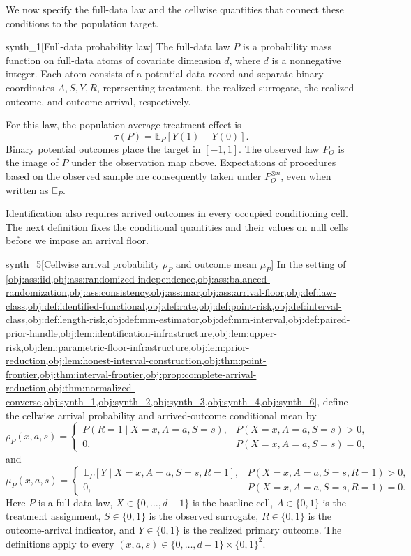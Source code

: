 We now specify the full-data law and the cellwise quantities that connect these conditions to the population target.

\begin{definitionv}{synth_1}[Full-data probability law]
The full-data law \(P\) is a probability mass function on full-data atoms of covariate dimension \(d\), where \(d\) is a nonnegative integer. Each atom consists of a potential-data record and separate binary coordinates \(A,S,Y,R\), representing treatment, the realized surrogate, the realized outcome, and outcome arrival, respectively.
\end{definitionv}

For this law, the population average treatment effect  is
\[
\tau(P)=\mathbb E_P\!\left[Y(1)-Y(0)\right].
\]
Binary potential outcomes place the target in \([-1,1]\). The observed law \(P_O\) is the image of \(P\) under the observation map above. Expectations of procedures based on the observed sample are consequently taken under \(P_O^{\otimes n}\), even when written as \(\mathbb E_P\).

Identification also requires arrived outcomes in every occupied conditioning cell. The next definition fixes the conditional quantities and their values on null cells before we impose an arrival floor.

\begin{definitionv}{synth_5}[Cellwise arrival probability $\rho_P$ and outcome mean $\mu_P$]
In the setting of \cref{obj:ass:iid,obj:ass:randomized-independence,obj:ass:balanced-randomization,obj:ass:consistency,obj:ass:mar,obj:ass:arrival-floor,obj:def:law-class,obj:def:identified-functional,obj:def:rate,obj:def:point-risk,obj:def:interval-class,obj:def:length-risk,obj:def:mm-estimator,obj:def:mm-interval,obj:def:paired-prior-handle,obj:lem:identification-infrastructure,obj:lem:upper-risk,obj:lem:parametric-floor-infrastructure,obj:lem:prior-reduction,obj:lem:honest-interval-construction,obj:thm:point-frontier,obj:thm:interval-frontier,obj:prop:complete-arrival-reduction,obj:thm:normalized-converse,obj:synth_1,obj:synth_2,obj:synth_3,obj:synth_4,obj:synth_6}, define the cellwise arrival probability and arrived-outcome conditional mean by
\[
\rho_P(x,a,s)=
\begin{cases}
P(R=1\mid X=x,A=a,S=s),
& P(X=x,A=a,S=s)>0,\\
0,
& P(X=x,A=a,S=s)=0,
\end{cases}
\]
and
\[
\mu_P(x,a,s)=
\begin{cases}
\mathbb E_P[Y\mid X=x,A=a,S=s,R=1],
& P(X=x,A=a,S=s,R=1)>0,\\
0,
& P(X=x,A=a,S=s,R=1)=0.
\end{cases}
\]
Here \(P\) is a full-data law, \(X\in\{0,\ldots,d-1\}\) is the baseline cell, \(A\in\{0,1\}\) is the treatment assignment, \(S\in\{0,1\}\) is the observed surrogate, \(R\in\{0,1\}\) is the outcome-arrival indicator, and \(Y\in\{0,1\}\) is the realized primary outcome. The definitions apply to every \((x,a,s)\in\{0,\ldots,d-1\}\times\{0,1\}^2\).
\end{definitionv}

